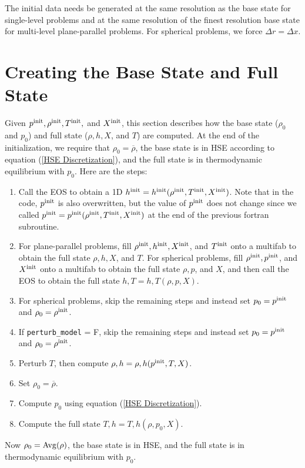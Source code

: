 \documentclass[11pt]{article}
\def\init  {\rm init}
\begin{document}
The initial data needs be generated at the same resolution as the base state for single-level problems and at the same resolution of the finest resolution base state for multi-level plane-parallel problems.  For spherical problems, we force $\Delta r = \Delta x$.
\section{Creating the Base State and Full State}
Given $p^{\init}, \rho^{\init}, T^{\init},$ and $X^{\init}$, this section describes how the base state ($\rho_0$ and $p_0$) and full state ($\rho, h, X$, and $T$) are computed.  At the end of the initialization, we require that $\rho_0 = \overline\rho$, the base state is in HSE according to equation (\ref{HSE Discretization}), and the full state is in thermodynamic equilibrium with $p_0$.  Here are the steps:
\begin{enumerate}
\item Call the EOS to obtain a 1D $h^{\init} = h^{\init}(\rho^{\init},T^{\init},X^{\init})$.  Note that in the code, $p^{\init}$ is also overwritten, but the value of $p^{\init}$ does not change since we called $p^{\init} = p^{\init}(\rho^{\init},T^{\init},X^{\init})$ at the end of the previous fortran subroutine.
\item For plane-parallel problems, fill $\rho^{\init}, h^{\init}, X^{\init}$, and $T^{\init}$ onto a multifab to obtain the full state $\rho, h, X$, and $T$.  For spherical problems, fill $\rho^{\init}, p^{\init}$, and $X^{\init}$ onto a multifab to obtain the full state $\rho, p$, and $X$, and then call the EOS to obtain the full state $h,T = h,T(\rho,p,X)$.
\item For spherical problems, skip the remaining steps and instead set $p_0 = p^{\init}$ and $\rho_0 = \rho^{\init}$.
\item If {\tt perturb\_model} = F, skip the remaining steps and instead set $p_0 = p^{\init}$ and $\rho_0 = \rho^{\init}$.
\item Perturb $T$, then compute $\rho,h = \rho,h(p^{\init},T,X)$.
\item Set $\rho_0 = \overline\rho$.
\item Compute $p_0$ using equation (\ref{HSE Discretization}).
\item Compute the full state $T,h = T,h(\rho,p_0,X)$.
\end{enumerate}
Now $\rho_0 = {\rm Avg}(\rho)$, the base state is in HSE, and the full state is in thermodynamic equilibrium with $p_0$.
\end{document}

